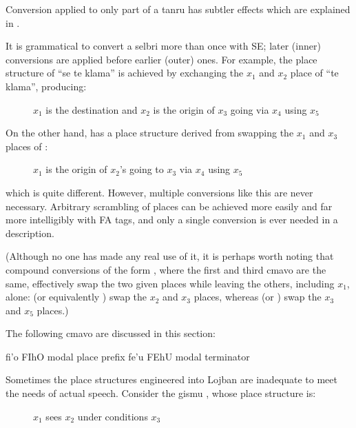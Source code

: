 Conversion applied to only part of a tanru has subtler
    effects which are explained in .

It is grammatical to convert a selbri more than once with
    SE; later (inner) conversions are applied before earlier
    (outer) ones. For example, the place structure of ``se te
    klama'' is achieved by exchanging the $x_1$ and $x_2$ place of ``te
    klama'', producing:
\begin{description}
\item[] $x_1$ is the destination and $x_2$ is the origin of $x_3$ going via $x_4$ using $x_5$

\end{description}

On the other hand,  has a place structure
    derived from swapping the $x_1$ and $x_3$ places of :
\begin{description}
\item[] $x_1$ is the origin of $x_2$'s going to $x_3$ via $x_4$ using $x_5$
\end{description}

which is quite different. However, multiple conversions like
    this are never necessary. Arbitrary scrambling of places can be
    achieved more easily and far more intelligibly with FA tags,
    and only a single conversion is ever needed in a description. 

(Although no one has made any real use of it, it is perhaps
    worth noting that compound conversions of the form ,
    where the first and third cmavo are the same, effectively swap
    the two given places while leaving the others, including $x_1$,
    alone:  (or equivalently ) swap the $x_2$ and
    $x_3$ places, whereas  (or ) swap the $x_3$ and
    $x_5$ places.)



The following cmavo are discussed in this section:

   fi'o    FIhO    modal place prefix
    fe'u    FEhU    modal terminator

Sometimes the place structures engineered into Lojban are
    inadequate to meet the needs of actual speech. Consider the
    gismu , whose place structure is:
\begin{description}
\item[] $x_1$ sees $x_2$ under conditions $x_3$

\end{description}


